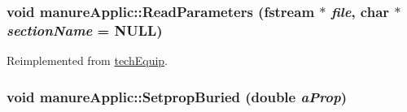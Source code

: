 \label{classmanure_applic_a389c300ba0029e1ed26a7b4c60e7cc3c}
\hypertarget{classmanure_applic_abd655046e002e2da34a796b45f0597e2}{
\subsubsection[{ReadParameters}]{\setlength{\rightskip}{0pt plus 5cm}void manureApplic::ReadParameters (fstream $\ast$ {\em file}, \/  char $\ast$ {\em sectionName} = {\ttfamily NULL})}}
\label{classmanure_applic_abd655046e002e2da34a796b45f0597e2}


Reimplemented from \hyperlink{classtech_equip_a7b8543a8ead2be2a6a00d80123895e2c}{techEquip}.\hypertarget{classmanure_applic_a711b90ca171d16b0153d11395f6de6ed}{
\subsubsection[{SetpropBuried}]{\setlength{\rightskip}{0pt plus 5cm}void manureApplic::SetpropBuried (double {\em aProp})}}
\label{classmanure_applic_a711b90ca171d16b0153d11395f6de6ed}


